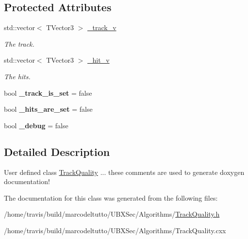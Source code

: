 \subsection*{Protected Attributes}
\begin{DoxyCompactItemize}
\item 
\hypertarget{classubana_1_1TrackQuality_a11971e9f972bc27655fd61c4dbb1a968}{std\-::vector$<$ T\-Vector3 $>$ \hyperlink{classubana_1_1TrackQuality_a11971e9f972bc27655fd61c4dbb1a968}{\-\_\-track\-\_\-v}}\label{classubana_1_1TrackQuality_a11971e9f972bc27655fd61c4dbb1a968}

\begin{DoxyCompactList}\small\item\em The track. \end{DoxyCompactList}\item 
\hypertarget{classubana_1_1TrackQuality_a1975a23a4dda1608199d4566321df300}{std\-::vector$<$ T\-Vector3 $>$ \hyperlink{classubana_1_1TrackQuality_a1975a23a4dda1608199d4566321df300}{\-\_\-hit\-\_\-v}}\label{classubana_1_1TrackQuality_a1975a23a4dda1608199d4566321df300}

\begin{DoxyCompactList}\small\item\em The hits. \end{DoxyCompactList}\item 
\hypertarget{classubana_1_1TrackQuality_ac11597aa4ac7214c06676cc4aa72d212}{bool {\bfseries \-\_\-track\-\_\-is\-\_\-set} = false}\label{classubana_1_1TrackQuality_ac11597aa4ac7214c06676cc4aa72d212}

\item 
\hypertarget{classubana_1_1TrackQuality_abd09b403297a31dce86e6a8e14c0aa15}{bool {\bfseries \-\_\-hits\-\_\-are\-\_\-set} = false}\label{classubana_1_1TrackQuality_abd09b403297a31dce86e6a8e14c0aa15}

\item 
\hypertarget{classubana_1_1TrackQuality_a891d785096de70af161e8e31b50ed706}{bool {\bfseries \-\_\-debug} = false}\label{classubana_1_1TrackQuality_a891d785096de70af161e8e31b50ed706}

\end{DoxyCompactItemize}


\subsection{Detailed Description}
User defined class \hyperlink{classubana_1_1TrackQuality}{Track\-Quality} ... these comments are used to generate doxygen documentation! 

The documentation for this class was generated from the following files\-:\begin{DoxyCompactItemize}
\item 
/home/travis/build/marcodeltutto/\-U\-B\-X\-Sec/\-Algorithms/\hyperlink{TrackQuality_8h}{Track\-Quality.\-h}\item 
/home/travis/build/marcodeltutto/\-U\-B\-X\-Sec/\-Algorithms/Track\-Quality.\-cxx\end{DoxyCompactItemize}
